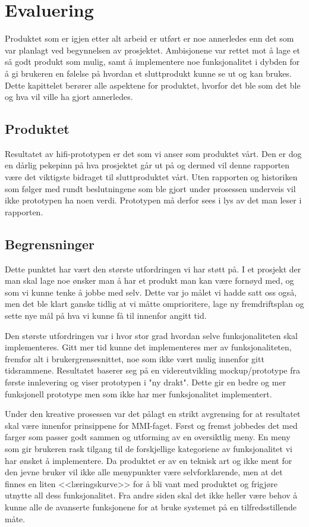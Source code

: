 \chapter{Evaluering}
\lettrine[lines=2]{P}{}roduktet som er igjen etter alt arbeid er utført er noe annerledes enn det som var planlagt ved begynnelsen av prosjektet.
Ambisjonene var rettet mot å lage et så godt produkt som mulig, samt å implementere noe funksjonalitet i dybden for å gi brukeren en følelse på hvordan et sluttprodukt kunne se ut og kan brukes. 
Dette kapittelet berører alle aspektene for produktet, hvorfor det ble som det ble og hva vil ville ha gjort annerledes.

\section{Produktet}
Resultatet av hifi-prototypen er det som vi anser som produktet vårt. 
Den er dog en dårlig pekepinn på hva prosjektet går ut på og dermed vil denne rapporten være det viktigste bidraget til sluttproduktet vårt. 
Uten rapporten og historiken som følger med rundt beslutningene som ble gjort under prosessen underveis vil ikke prototypen ha noen verdi. Prototypen må derfor sees i lys av det man leser i rapporten.

\section{Begrensninger} \label{sec:begrensninger}
Dette punktet har vært den største utfordringen vi har støtt på. I et prosjekt der man skal lage noe ønsker man å har et produkt man kan være fornøyd med, og som vi kunne tenke å jobbe med selv. Dette var jo målet vi hadde satt oss også, men det ble klart ganske tidlig at vi måtte omprioritere, lage ny fremdriftsplan og sette nye mål på hva vi kunne få til innenfor angitt tid.

Den største utfordringen var i hvor stor grad hvordan selve funksjonaliteten skal implementeres. 
Gitt mer tid kunne det implementeres mer av funksjonaliteten, fremfor alt i brukergrensesnittet, noe som ikke vært mulig innenfor gitt tidsrammene.
Resultatet baserer seg på en videreutvikling mockup/prototype fra første innlevering og viser prototypen i "ny drakt". Dette gir en bedre og mer funksjonell prototype men som ikke har mer funksjonalitet implementert.

Under den kreative prosessen var det pålagt en strikt avgrensing for at resultatet skal være innenfor prinsippene for MMI-faget.
Først og fremst jobbedes det med farger som passer godt sammen og utforming av en oversiktlig meny. En meny som gir brukeren rask tilgang til de forskjellige kategoriene av funksjonalitet vi har ønsket å implementere.
Da produktet er av en teknisk art og ikke ment for den jevne bruker vil ikke alle menypunkter være selvforklarende, men at det finnes en liten <<læringskurve>> for å bli vant med produktet og frigjøre utnytte all dess funksjonalitet.
Fra andre siden skal det ikke heller være behov å kunne alle de avanserte funksjonene for at bruke systemet på en tilfredsstillende måte.

